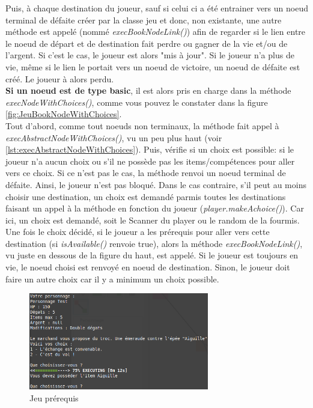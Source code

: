 		Puis, à chaque destination du joueur, sauf si celui ci a été entrainer vers un noeud terminal de défaite créer par la classe jeu et donc, non existante, une autre méthode est appelé (nommé \textit{execBookNodeLink()}) afin de regarder si le lien entre le noeud de départ et de destination fait perdre ou gagner de la vie et/ou de l'argent. Si c'est le cas, le joueur est alors "mis à jour". Si le joueur n'a plus de vie, même si le lien le portait vers un noeud de victoire, un noeud de défaite est créé. Le joueur à alors perdu. \\

		\textbf{Si un noeud est de type basic}, il est alors pris en charge dans la méthode \textit{execNodeWithChoices()}, comme vous pouvez le constater dans la figure \ref{fig:JeuBookNodeWithChoices}.\\
		Tout d'abord, comme tout noeuds non terminaux, la méthode fait appel à \textit{execAbstractNodeWithChoices()}, vu un peu plus haut (voir \ref{lst:execAbstractNodeWithChoices}). Puis, vérifie si un choix est possible: si le joueur n'a aucun choix ou s'il ne possède pas les items/compétences pour aller vers ce choix. Si ce n'est pas le cas, la méthode renvoi un noeud terminal de défaite. Ainsi, le joueur n'est pas bloqué. Dans le cas contraire, s'il peut au moins choisir une destination, un choix est demandé parmis toutes les destinations faisant un appel à la méthode en fonction du joueur (\textit{player.makeAchoice()}). Car ici, un choix est demandé, soit le Scanner du player ou le random de la fourmis. Une fois le choix décidé, si le joueur a les prérequis pour aller vers cette destination (si \textit{isAvailable()} renvoie true), alors la méthode \textit{execBookNodeLink()}, vu juste en dessous de la figure du haut, est appelé. Si le joueur est toujours en vie, le noeud choisi est renvoyé en noeud de destination. Sinon, le joueur doit faire un autre choix car il y a minimum un choix possible.\\

		\begin{figure}[H]
			\centering\includegraphics[width=0.70\textwidth]{img/codeJeuPrerequis.png}
			\caption{Jeu prérequis}
			\label{fig:codeJeuPrerequis}
		\end{figure}

